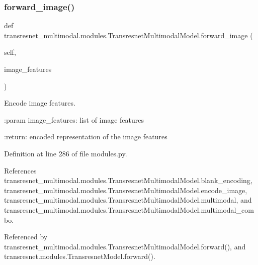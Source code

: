 \mbox{\label{classtransresnet__multimodal_1_1modules_1_1TransresnetMultimodalModel_aec98b66974021d37e0e256be86aa16f2}} 
\subsubsection{\texorpdfstring{forward\+\_\+image()}{forward\_image()}}
{\footnotesize\ttfamily def transresnet\+\_\+multimodal.\+modules.\+Transresnet\+Multimodal\+Model.\+forward\+\_\+image (\begin{DoxyParamCaption}\item[{}]{self,  }\item[{}]{image\+\_\+features }\end{DoxyParamCaption})}

\begin{DoxyVerb}Encode image features.

:param image_features:
    list of image features

:return:
    encoded representation of the image features
\end{DoxyVerb}
 

Definition at line 286 of file modules.\+py.



References transresnet\+\_\+multimodal.\+modules.\+Transresnet\+Multimodal\+Model.\+blank\+\_\+encoding, transresnet\+\_\+multimodal.\+modules.\+Transresnet\+Multimodal\+Model.\+encode\+\_\+image, transresnet\+\_\+multimodal.\+modules.\+Transresnet\+Multimodal\+Model.\+multimodal, and transresnet\+\_\+multimodal.\+modules.\+Transresnet\+Multimodal\+Model.\+multimodal\+\_\+combo.



Referenced by transresnet\+\_\+multimodal.\+modules.\+Transresnet\+Multimodal\+Model.\+forward(), and transresnet.\+modules.\+Transresnet\+Model.\+forward().

